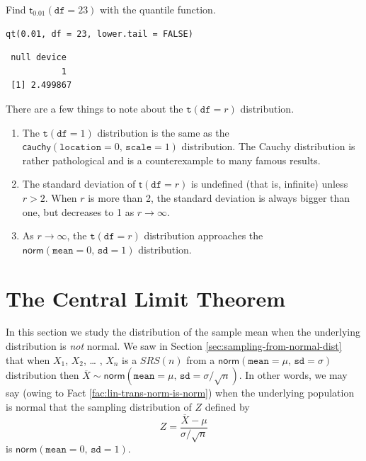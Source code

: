 \documentclass[captions=tableheading]{scrbook}
\begin{document}
\begin{example}
Find \(\mathsf{t}{}_{0.01}(\mathtt{df}=23)\) with the quantile function.
\end{example}


\begin{verbatim}
qt(0.01, df = 23, lower.tail = FALSE)
\end{verbatim}

\begin{verbatim}
 null device 
           1
 [1] 2.499867
\end{verbatim}

\begin{rem}
There are a few things to note about the \(\mathtt{t}(\mathtt{df}=r)\) distribution.
\begin{enumerate}
\item The \(\mathtt{t}(\mathtt{df}=1)\) distribution is the same as the \(\mathsf{cauchy}(\mathtt{location}=0,\,\mathtt{scale}=1)\) distribution. The Cauchy distribution is rather pathological and is a counterexample to many famous results.
\item The standard deviation of \(\mathsf{t}(\mathtt{df}=r)\) is undefined (that is, infinite) unless \(r>2\). When \(r\) is more than 2, the standard deviation is always bigger than one, but decreases to 1 as \(r\to\infty\).
\item As \(r\to\infty\), the \(\mathtt{t}(\mathtt{df}=r)\) distribution approaches the \(\mathsf{norm}(\mathtt{mean}=0,\,\mathtt{sd}=1)\) distribution.
\end{enumerate}
\end{rem}
\section{The Central Limit Theorem}
\label{sec-8-3}

\label{sec:Central-Limit-Theorem}

In this section we study the distribution of the sample mean when the underlying distribution is \emph{not} normal. We saw in Section \ref{sec:sampling-from-normal-dist} that when \(X_{1}\), \(X_{2}\), \ldots{} , \(X_{n}\) is a \(SRS(n)\) from a \(\mathsf{norm}(\mathtt{mean}=\mu,\,\mathtt{sd}=\sigma)\) distribution then \(\overline{X}\sim\mathsf{norm}(\mathtt{mean}=\mu,\,\mathtt{sd}=\sigma/\sqrt{n})\). In other words, we may say (owing to Fact \ref{fac:lin-trans-norm-is-norm}) when the underlying population is normal that the sampling distribution of \(Z\) defined by
\begin{equation}
Z=\frac{\overline{X}-\mu}{\sigma/\sqrt{n}}
\end{equation}
is \(\mathsf{norm}(\mathtt{mean}=0,\,\mathtt{sd}=1)\). 
\end{document}
